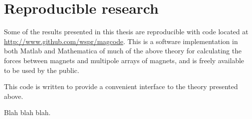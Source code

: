 \section{Reproducible research}

Some of the results presented in this thesis are reproducible \parencite{kovacevic2007-icassp} with code located at \url{http://www.github.com/wspr/magcode}. This is a software implementation in both Matlab and Mathematica  of much of the above theory for calculating the forces between magnets and multipole arrays of magnets, and is freely available to be used by the public.

This code is written to provide a convenient interface to the theory presented above.

Blah blah blah.

